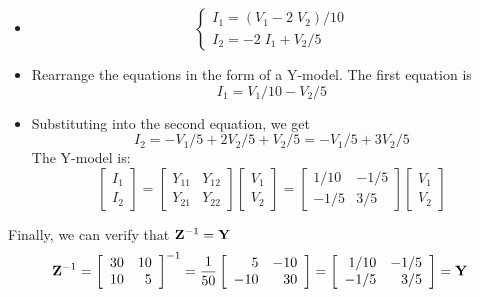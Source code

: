 \documentclass{article}
\begin{document}
\begin{itemize}
\item
\begin{equation}	
  \left\{ \begin{array}{l} 
    I_1=(V_1-2\;V_2)/10 \\ I_2=-2\;I_1+V_2/5 \end{array} \right. 
\end{equation}
\item Rearrange the equations in the form of a Y-model. The first equation is
\begin{equation}
  I_1=V_1/10-V_2/5	
\end{equation}
\item Substituting into the second equation, we get
\begin{equation}	
  I_2=-V_1/5+2V_2/5+V_2/5=-V_1/5+3V_2/5	
\end{equation}
The Y-model is:
\begin{equation}
  \left[ \begin{array}{l} I_1 \\ I_2 \end{array} \right]=
  \left[ \begin{array}{rr} Y_{11} & Y_{12} \\ Y_{21} & Y_{22} \end{array} \right]
  \left[ \begin{array}{l} V_1 \\ V_2 \end{array} \right]
  =\left[ \begin{array}{rr} 1/10 & -1/5 \\ -1/5 & 3/5 \end{array} \right]
  \left[ \begin{array}{l} V_1 \\ V_2 \end{array} \right] 
\end{equation}
\end{itemize}
Finally, we can verify that ${\bf Z}^{-1}={\bf Y}$
\begin{equation} 
  {\bf Z}^{-1}=\left[ \begin{array}{rr} 30 & 10 \\ 10 & 5 \end{array} \right]^{-1}
  =\frac{1}{50}\left[ \begin{array}{rr} 5 & -10 \\ -10 & 30 \end{array} \right]
  =\left[ \begin{array}{rr} 1/10 & -1/5 \\ -1/5 & 3/5 \end{array} \right]
  ={\bf Y}	
\end{equation}
\end{document}
